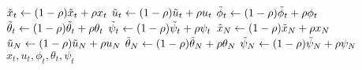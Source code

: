 \documentclass[letterpaper,11pt]{article}
\begin{document}
\begin{algorithm}[!htpb]
\begin{algorithmic}[1]
                \State $\tilde{x}_t \gets (1-\rho)\tilde{x}_t + \rho x_t$
                \State $\tilde{u}_t \gets (1-\rho)\tilde{u}_t + \rho u_t$
                \State $\tilde{\phi}_t \gets (1-\rho)\tilde{\phi}_t + \rho \phi_t$
                \State $\tilde{\theta}_t \gets (1-\rho)\tilde{\theta}_t + \rho \theta_t$
                \State $\tilde{\psi}_t \gets (1-\rho)\tilde{\psi}_t + \rho \psi_t$
            \EndFor
            \State $\tilde{x}_N \gets (1-\rho)\tilde{x}_N + \rho x_N$
            \State $\tilde{u}_N \gets (1-\rho)\tilde{u}_N + \rho u_N$
            \State $\tilde{\theta}_N \gets (1-\rho)\tilde{\theta}_N + \rho \theta_N$
            \State $\tilde{\psi}_N \gets (1-\rho)\tilde{\psi}_N + \rho \psi_N$            
        \EndFor
        \Ensure $x_t,u_t,\phi_t,\theta_t,\psi_t$
    \end{algorithmic}
\end{algorithm}



\end{document}

